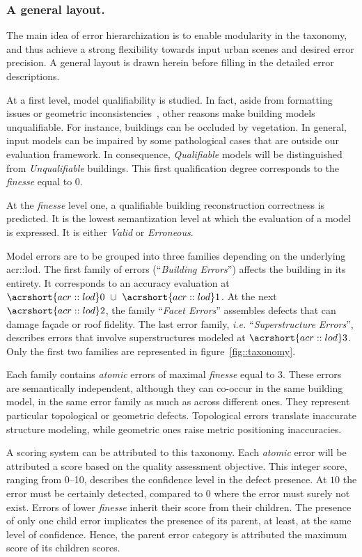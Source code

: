 \documentclass[runningheads]{llncs}
\begin{document}
\subsubsection{A general layout.}
The main idea of error hierarchization is to enable modularity in the taxonomy, and thus achieve a strong flexibility towards input urban scenes and desired error precision. A general layout is drawn herein before filling in the detailed error descriptions.

At a first level, model qualifiability is studied. In fact, aside from formatting issues or geometric inconsistencies~\cite{ledoux2018val3dity}, other reasons make building models unqualifiable. For instance, buildings can be occluded by vegetation. In general, input models can be impaired by some pathological cases that are outside our evaluation framework. In consequence, \textit{Qualifiable} models will be distinguished from \textit{Unqualifiable} buildings. This first qualification degree corresponds to the \textit{finesse} equal to $0$.

At the \textit{finesse} level one, a qualifiable building reconstruction correctness is predicted. It is the lowest semantization level at which the evaluation of a model is expressed. It is either \textit{Valid} or \textit{Erroneous}.

Model errors are to be grouped into three families depending on the underlying \acrshort{acr::lod}. The first family of errors (``\textit{Building Errors}'') affects the building in its entirety. It corresponds to an accuracy evaluation at $\acrshort{acr::lod}0\text{ } \cup \text{ }\acrshort{acr::lod}1$. At the next $\acrshort{acr::lod}2$, the family ``\textit{Facet Errors}'' assembles defects that can damage fa\c{c}ade or roof fidelity. The last error family, \textit{i.e.} ``\textit{Superstructure Errors}'', describes errors that involve superstructures modeled at $\acrshort{acr::lod}3$. Only the first two families are represented in figure~\ref{fig::taxonomy}.

Each family contains \textit{atomic} errors of maximal \textit{finesse} equal to $3$. These errors are semantically independent, although they can co-occur in the same building model, in the same error family as much as across different ones. They represent particular topological or geometric defects. Topological errors translate inaccurate structure modeling, while geometric ones raise metric positioning inaccuracies.

A scoring system can be attributed to this taxonomy. Each \textit{atomic} error will be attributed a score based on the quality assessment objective. This integer score, ranging from \SIrange{0}{10}{}, describes the confidence level in the defect presence. At $10$ the error must be certainly detected, compared to $0$ where the error must surely not exist. Errors of lower \textit{finesse} inherit their score from their children. The presence of only one child error implicates the presence of its parent, at least, at the same level of confidence. Hence, the parent error category is attributed the maximum score of its children scores.
\end{document}
